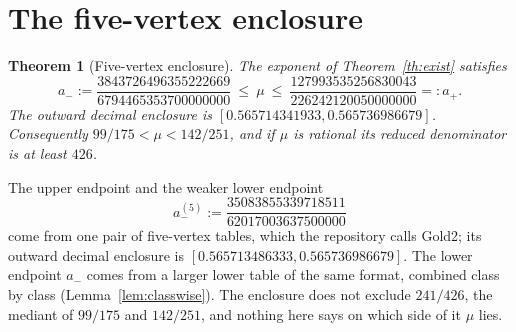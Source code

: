 \documentclass[11pt]{article}
\newtheorem{theorem}{Theorem}
\newcommand{\resulttag}{?}
\newcommand{\tagnext}[1]{\renewcommand{\resulttag}{#1}}
\theoremstyle{remark}
\numberwithin{equation}{section}
\begin{document}
\section{The five-vertex enclosure}\label{sec:enc}
\tagnext{ENC}
\begin{theorem}[Five-vertex enclosure]\label{th:gold2}
The exponent of Theorem~\ref{th:exist} satisfies
\[
 a_-:=\frac{3843726496355222669}{6794465353700000000}\ \le\ \mu\ \le\
 \frac{127993535256830043}{226242120050000000}=:a_+ .
\]
The outward decimal enclosure is $[0.565714341933,0.565736986679]$. Consequently $99/175<\mu<142/251$, and if $\mu$ is rational its reduced denominator is at least $426$.
\end{theorem}
The upper endpoint and the weaker lower endpoint
\[
 a_-^{(5)}:=\frac{35083855339718511}{62017003637500000}
\]
come from one pair of five-vertex tables, which the repository calls Gold2; its outward decimal enclosure is $[0.565713486333,0.565736986679]$. The lower endpoint $a_-$ comes from a larger lower table of the same format, combined class by class (Lemma~\ref{lem:classwise}). The enclosure does not exclude $241/426$, the mediant of $99/175$ and $142/251$, and nothing here says on which side of it $\mu$ lies.
\end{document}
